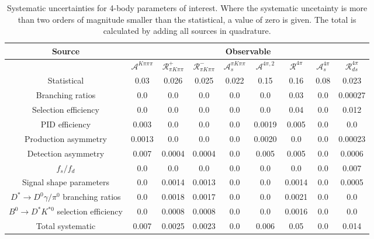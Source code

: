 \begin{sidewaystable}
  \centering
  \begin{tabular}{ccccccccc}
      \toprule
      Source & \multicolumn{8}{c}{Observable} \\
      \midrule
       & $\mathcal{A}^{K\pi\pi\pi}$ & $\mathcal{R}_{\pi K\pi\pi}^+$ & $\mathcal{R}_{\pi K\pi\pi}^-$ & $\mathcal{A}_s^{\pi K\pi\pi}$ & $\mathcal{A}^{4\pi,2}$ & $\mathcal{R}^{4\pi}$ & $\mathcal{A}_s^{4\pi}$ & $\mathcal{R}_{ds}^{4\pi}$ \\
      \midrule
      Statistical & 0.03 & 0.026 & 0.025 & 0.022 & 0.15 & 0.16 & 0.08 & 0.023 \\
      \midrule
      Branching ratios & 0.0  & 0.0  & 0.0  & 0.0  & 0.0  & 0.03 & 0.0  & 0.00027 \\
      Selection efficiency & 0.0  & 0.0  & 0.0  & 0.0  & 0.0  & 0.04 & 0.0  & 0.012 \\
      PID efficiency & 0.003 & 0.0  & 0.0  & 0.0  & 0.0019 & 0.005 & 0.0  & 0.0  \\
      Production asymmetry & 0.0013 & 0.0  & 0.0  & 0.0  & 0.0020 & 0.0  & 0.0  & 0.00023 \\
      Detection asymmetry & 0.007 & 0.0004 & 0.0004 & 0.0  & 0.005 & 0.005 & 0.0  & 0.0006 \\
      $f_s/f_d$ & 0.0  & 0.0  & 0.0  & 0.0  & 0.0  & 0.0  & 0.0  & 0.007 \\
      Signal shape parameters & 0.0  & 0.0014 & 0.0013 & 0.0  & 0.0  & 0.0014 & 0.0  & 0.0005 \\
      $D^* \to D^0 \gamma/\pi^0$ branching ratios & 0.0  & 0.0018 & 0.0017 & 0.0  & 0.0  & 0.0021 & 0.0  & 0.0  \\
      $B^0 \to D^* K^{*0}$ selection efficiency & 0.0  & 0.0008 & 0.0008 & 0.0  & 0.0  & 0.0016 & 0.0  & 0.0  \\
      \midrule
      Total systematic & 0.007 & 0.0025 & 0.0023 & 0.0 & 0.006 & 0.05 & 0.0 & 0.014 \\
      \bottomrule
  \end{tabular}
  \caption{Systematic uncertainties for 4-body parameters of interest. Where the systematic uncetainty is more than two orders of magnitude smaller than the statistical, a value of zero is given. The total is calculated by adding all sources in quadrature.}
\label{tab:fourBody_systematics}
\end{sidewaystable}
